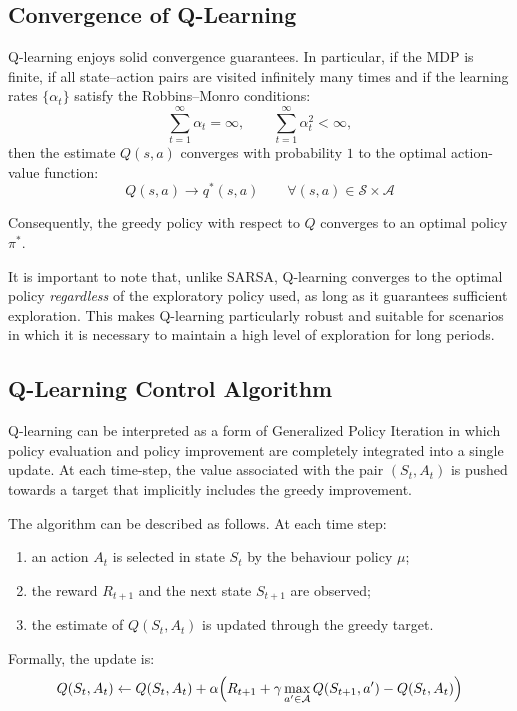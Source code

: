 \subsection{Convergence of Q-Learning}

Q-learning enjoys solid convergence guarantees. In particular, if the MDP is finite, if all state–action pairs are visited infinitely many times and if the learning rates $\{\alpha_t\}$ satisfy the Robbins–Monro conditions:
\[
\sum_{t=1}^{\infty} \alpha_t = \infty,
\qquad
\sum_{t=1}^{\infty} \alpha_t^2 < \infty,
\]
then the estimate $Q(s,a)$ converges with probability $1$ to the optimal action-value function:
\[
Q(s,a) \longrightarrow q^*(s,a)
\qquad \forall (s,a) \in \mathcal{S} \times \mathcal{A}
\]

Consequently, the greedy policy with respect to $Q$ converges to an optimal policy $\pi^*$.

It is important to note that, unlike SARSA, Q-learning converges to the optimal policy \emph{regardless} of the exploratory policy used, as long as it guarantees sufficient exploration. This makes Q-learning particularly robust and suitable for scenarios in which it is necessary to maintain a high level of exploration for long periods.


\subsection{Q-Learning Control Algorithm}

Q-learning can be interpreted as a form of Generalized Policy Iteration in which policy evaluation and policy improvement are completely integrated into a single update. At each time-step, the value associated with the pair $(S_t, A_t)$ is pushed towards a target that implicitly includes the greedy improvement.

The algorithm can be described as follows. At each time step:
\begin{enumerate}
    \item an action $A_t$ is selected in state $S_t$ by the behaviour policy $\mu$;
    \item the reward $R_{t+1}$ and the next state $S_{t+1}$ are observed;
    \item the estimate of $Q(S_t, A_t)$ is updated through the greedy target.
\end{enumerate}

Formally, the update is:
\[
Q(S_t, A_t)
\leftarrow
Q(S_t, A_t)
+
\alpha
\Bigl(
R_{t+1}
+
\gamma
\max_{a' \in \mathcal{A}} Q(S_{t+1}, a')
-
Q(S_t, A_t)
\Bigr)
\]

